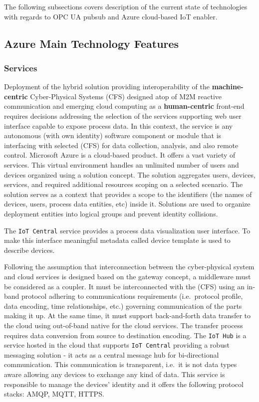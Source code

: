 \documentclass{jacsart}
\begin{document}
The following subsections covers description of the current state of technologies with regards to OPC UA pubsub and Azure cloud-based IoT enabler.

\hypertarget{azure-main-technology-features}{%
      \subsection{Azure Main Technology Features}\label{azure-main-technology-features}}

\hypertarget{services}{%
      \subsubsection{Services}\label{services}}

Deployment of the hybrid solution providing interoperability of the
\textbf{machine-centric} Cyber-Physical Systems (CFS) designed atop of M2M
reactive communication and emerging cloud computing as a
\textbf{human-centric} front-end requires decisions addressing the
selection of the services supporting web user interface capable to
expose process data. In this context, the service is any
autonomous (with own identity) software component or module that is
interfacing with selected (CFS) for data collection,
analysis, and also remote control. Microsoft Azure is a cloud-based
product. It offers a vast variety of services. This virtual environment
handles an unlimited number of users and devices organized using a
solution concept. The solution aggregates users, devices, services, and
required additional resources scoping on a selected scenario. The
solution serves as a context that provides a scope to the identifiers
(the names of devices, users, process data entities, etc) inside it.
Solutions are used to organize deployment entities into logical groups
and prevent identity collisions.

The \texttt{IoT\ Central} service provides a process data visualization
user interface. To make this interface meaningful metadata called device
template is used to describe devices.

Following the assumption that interconnection between the cyber-physical
system and cloud services is designed based on the gateway concept, a
middleware must be considered as a coupler. It must be interconnected
with the (CFS) using an in-band protocol adhering to
communications requirements (i.e.~protocol profile, data encoding, time
relationships, etc.) governing communication of the parts making it up.
At the same time, it must support back-and-forth data transfer to the
cloud using out-of-band native for the cloud services. The transfer
process requires data conversion from source to destination encoding.
The \texttt{IoT\ Hub} is a service hosted in the cloud that supports
\texttt{IoT\ Central} providing a robust messaging solution - it acts as
a central message hub for bi-directional communication. This
communication is transparent, i.e.~it is not data types aware allowing
any devices to exchange any kind of data. This service is responsible to
manage the devices' identity and it offers the following protocol
stacks: AMQP, MQTT, HTTPS.
\end{document}
